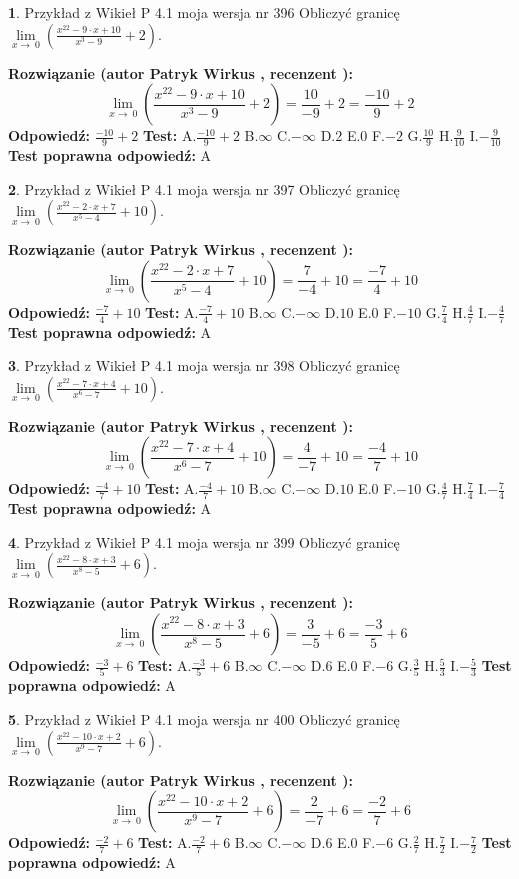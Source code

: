 \documentclass[12pt, a4paper]{article}
\theoremstyle{definition} %
\newtheorem{zad}{}
\newcommand{\zadStart}[1]{\begin{zad}#1\newline}
\newcommand{\zadStop}{\end{zad}}
\newcommand{\rozwStart}[2]{\noindent \textbf{Rozwiązanie (autor #1 , recenzent #2): }\newline}
\newcommand{\rozwStop}{\newline}
\newcommand{\odpStart}{\noindent \textbf{Odpowiedź:}\newline}
\newcommand{\odpStop}{\newline}
\newcommand{\testStart}{\noindent \textbf{Test:}\newline}
\newcommand{\testStop}{\newline}
\newcommand{\kluczStart}{\noindent \textbf{Test poprawna odpowiedź:}\newline}
\newcommand{\kluczStop}{\newline}
\begin{document}
\zadStart{Przykład z Wikieł P 4.1 moja wersja nr 396}
Obliczyć granicę $\lim\limits_{x\to\ 0}(\frac{x^{22}-9 \cdot x +10}{x^{3}-9}+2)$.
\zadStop
\rozwStart{Patryk Wirkus}{}
$$\lim\limits_{x\to\ 0}(\frac{x^{22}-9 \cdot x +10}{x^{3}-9}+2)=\frac{10}{-9}+2=\frac{-10}{9}+2$$
\rozwStop
\odpStart
$\frac{-10}{9}+2$
\odpStop
\testStart
A.$\frac{-10}{9}+2$
B.$\infty$
C.$-\infty$
D.$2$
E.$0$
F.$-2$
G.$\frac{10}{9}$
H.$\frac{9}{10}$
I.$-\frac{9}{10}$
\testStop
\kluczStart
A
\kluczStop



\zadStart{Przykład z Wikieł P 4.1 moja wersja nr 397}
Obliczyć granicę $\lim\limits_{x\to\ 0}(\frac{x^{22}-2 \cdot x +7}{x^{5}-4}+10)$.
\zadStop
\rozwStart{Patryk Wirkus}{}
$$\lim\limits_{x\to\ 0}(\frac{x^{22}-2 \cdot x +7}{x^{5}-4}+10)=\frac{7}{-4}+10=\frac{-7}{4}+10$$
\rozwStop
\odpStart
$\frac{-7}{4}+10$
\odpStop
\testStart
A.$\frac{-7}{4}+10$
B.$\infty$
C.$-\infty$
D.$10$
E.$0$
F.$-10$
G.$\frac{7}{4}$
H.$\frac{4}{7}$
I.$-\frac{4}{7}$
\testStop
\kluczStart
A
\kluczStop



\zadStart{Przykład z Wikieł P 4.1 moja wersja nr 398}
Obliczyć granicę $\lim\limits_{x\to\ 0}(\frac{x^{22}-7 \cdot x +4}{x^{6}-7}+10)$.
\zadStop
\rozwStart{Patryk Wirkus}{}
$$\lim\limits_{x\to\ 0}(\frac{x^{22}-7 \cdot x +4}{x^{6}-7}+10)=\frac{4}{-7}+10=\frac{-4}{7}+10$$
\rozwStop
\odpStart
$\frac{-4}{7}+10$
\odpStop
\testStart
A.$\frac{-4}{7}+10$
B.$\infty$
C.$-\infty$
D.$10$
E.$0$
F.$-10$
G.$\frac{4}{7}$
H.$\frac{7}{4}$
I.$-\frac{7}{4}$
\testStop
\kluczStart
A
\kluczStop



\zadStart{Przykład z Wikieł P 4.1 moja wersja nr 399}
Obliczyć granicę $\lim\limits_{x\to\ 0}(\frac{x^{22}-8 \cdot x +3}{x^{8}-5}+6)$.
\zadStop
\rozwStart{Patryk Wirkus}{}
$$\lim\limits_{x\to\ 0}(\frac{x^{22}-8 \cdot x +3}{x^{8}-5}+6)=\frac{3}{-5}+6=\frac{-3}{5}+6$$
\rozwStop
\odpStart
$\frac{-3}{5}+6$
\odpStop
\testStart
A.$\frac{-3}{5}+6$
B.$\infty$
C.$-\infty$
D.$6$
E.$0$
F.$-6$
G.$\frac{3}{5}$
H.$\frac{5}{3}$
I.$-\frac{5}{3}$
\testStop
\kluczStart
A
\kluczStop



\zadStart{Przykład z Wikieł P 4.1 moja wersja nr 400}
Obliczyć granicę $\lim\limits_{x\to\ 0}(\frac{x^{22}-10 \cdot x +2}{x^{9}-7}+6)$.
\zadStop
\rozwStart{Patryk Wirkus}{}
$$\lim\limits_{x\to\ 0}(\frac{x^{22}-10 \cdot x +2}{x^{9}-7}+6)=\frac{2}{-7}+6=\frac{-2}{7}+6$$
\rozwStop
\odpStart
$\frac{-2}{7}+6$
\odpStop
\testStart
A.$\frac{-2}{7}+6$
B.$\infty$
C.$-\infty$
D.$6$
E.$0$
F.$-6$
G.$\frac{2}{7}$
H.$\frac{7}{2}$
I.$-\frac{7}{2}$
\testStop
\kluczStart
A
\kluczStop
\end{document}
